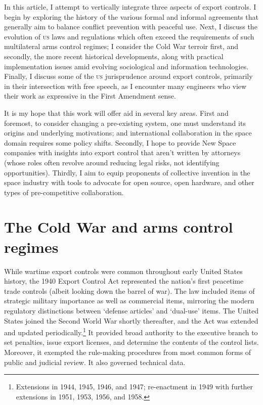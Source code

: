 \documentclass[12pt]{olfmemo}
\begin{document}
In this article, I attempt to vertically integrate three aspects of export controls. I begin by exploring the history of the various formal and informal agreements that generally aim to balance conflict prevention with peaceful use. Next, I discuss the evolution of \textsc{us} laws and regulations which often exceed the requirements of such multilateral arms control regimes; I consider the Cold War terroir first, and secondly, the more recent historical developments, along with practical implementation issues amid evolving sociological and information technologies. Finally, I discuss some of the \textsc{us} jurisprudence around export controls, primarily in their intersection with free speech, as I encounter many engineers who view their work as expressive in the First Amendment sense.

It is my hope that this work will offer aid in several key areas. First and foremost, to consider changing a pre-existing system, one must understand its origins and underlying motivations; and international collaboration in the space domain requires some policy shifts. Secondly, I hope to provide New Space companies with insights into export control that aren't written by attorneys (whose roles often revolve around reducing legal risks, not identifying opportunities). Thirdly, I aim to equip proponents of collective invention in the space industry with tools to advocate for open source, open hardware, and other types of pre-competitive collaboration.

\section{The Cold War and arms control regimes}\label{sec:coldwar}
While wartime export controls were common throughout early United States history, the 1940 Export Control Act represented the nation's first peacetime trade controls (albeit looking down the barrel of war). The law included items of strategic military importance as well as commercial items, mirroring the modern regulatory distinctions between `defense articles' and `dual-use' items. The United States joined the Second World War shortly thereafter, and the Act was extended and updated periodically.\footnote{Extensions in 1944, 1945, 1946, and 1947; re-enactment in 1949 with further extensions in 1951, 1953, 1956, and 1958.} It provided broad authority to the executive branch to set penalties, issue export licenses, and determine the contents of the control lists. Moreover, it exempted the rule-making procedures from most common forms of public and judicial review. It also governed technical data. \citep{NAP1987}
\end{document}
